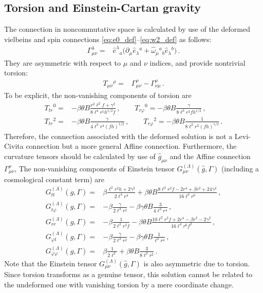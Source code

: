 \documentclass[11pt]{article}
\newcommand{\vap}{\varphi}
\numberwithin{equation}{section}
\begin{document}
\subsection{Torsion and Einstein-Cartan gravity}
\label{sec:tors-einst-cart}

The connection in noncommutative space is calculated by use of the deformed vielbeins and
spin connections \eqref{eq:e0_def}--\eqref{eq:w2_def} as follows:
\begin{align}
  \Gamma^\lambda_{\mu\nu}=& \hat{e}^\lambda{}_a \big(\partial_\mu
 \hat{e}_\lambda{}^a + \hat{\omega}_\mu{}^a{}_b \hat{e}_\lambda{}^b \big)
\,.
\end{align}
They are asymmetric with respect to $\mu$ and $\nu$ indices,
and provide nontrivial torsion:
\begin{align}
  T_{\mu\nu}{}^\rho=& \Gamma_{\mu\nu}^\rho - \Gamma_{\nu\mu}^\rho \,.
\end{align}
To be explicit, the non-vanishing components of torsion are
\begin{align}
  T_{tr}{}^0=& -\beta \theta B \frac{r^2 \ell^2 f+\gamma^2}{8\ell^4 r^5 h^{1/2} f} \,,
\qquad
T_{r\vap}{}^0= -\beta \theta B \frac{\gamma}{8 \ell^3 r^3 f h^{1/2}}
\,,\\
  T_{tr}{}^2 =&
-\beta \theta B \frac{\gamma}{4\ell^3 r^4 (fh)^{1/2}} 
\,,\qquad
T_{r\vap}{}^2 =
-\beta \theta B \frac{1}{8\ell^2 r^2 (fh)^{1/2}} 
\label{eq:torsion_values}
\,.
\end{align}
Therefore, the connection associated with the deformed solution is not a Levi-Civita connection
but a more general Affine connection.
Furthermore, the curvature tensors should be calculated by use of $\hat{g}_{\mu\nu}$ and the Affine connection $\Gamma_{\mu\nu}^\rho$,
The non-vanishing components of Einstein tensor $G^{(\Lambda)}_{\mu\nu}(\hat{g},\Gamma)$ (including a cosmological constant
term) are
\begin{align}
  G^{(\Lambda)}_{tt}(\hat{g},\Gamma)=& \beta \frac{\ell^2 r^2 h + 2\gamma^2}{2\ell^4 r^4}
+ \beta \theta B \frac{8\ell^2 r^2 f -2r^4+\beta r^2 + 24 \gamma^2}{16 \ell^4 r^6}
\,,\\
  G^{(\Lambda)}_{t\vap}(\hat{g},\Gamma)=& -\beta \frac{\gamma}{2\ell^3 r^2} - \beta \gamma \theta B\frac{3}{4 \ell^3 r^4}
\,,\\
  G^{(\Lambda)}_{rr}(\hat{g},\Gamma)=& -\beta\frac{1}{2\ell^2 r^2 f} -\beta \theta B \frac{10 \ell^2 r^2 f + 2r^4-\beta r^2 -2\gamma^2}{16 \ell^4 r^6 f^2} 
\,,\\
  G^{(\Lambda)}_{\vap t}(\hat{g},\Gamma)=& -\beta \frac{\gamma}{2\ell^3 r^2} - \beta \gamma \theta B\frac{1}{ \ell^3 r^4}
\,,\\
  G^{(\Lambda)}_{\vap \vap}(\hat{g},\Gamma)=& \beta \frac{1}{2\ell^2} + \beta \theta B \frac{3}{8\ell^2 r^2} \,.
\end{align}
Note that the Einstein tensor $G^{(\Lambda)}_{\mu\nu}(\hat{g},\Gamma)$ is also asymmetric
due to torsion.
Since torsion transforms as a genuine tensor, this solution cannot be related to the undeformed one 
with vanishing torsion by a mere coordinate change.
\end{document}
